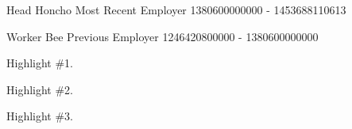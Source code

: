 
\begin{cventries}

  \cventry
    {Head Honcho}
    {Most Recent Employer}
    {}
    {1380600000000 - 1453688110613}
    {
    }

  \cventry
    {Worker Bee}
    {Previous Employer}
    {}
    {1246420800000 - 1380600000000}
    {
      \begin{cvitems}
        \item {Highlight \#1.}
        \item {Highlight \#2.}
        \item {Highlight \#3.}
      \end{cvitems}
    }

\end{cventries}

